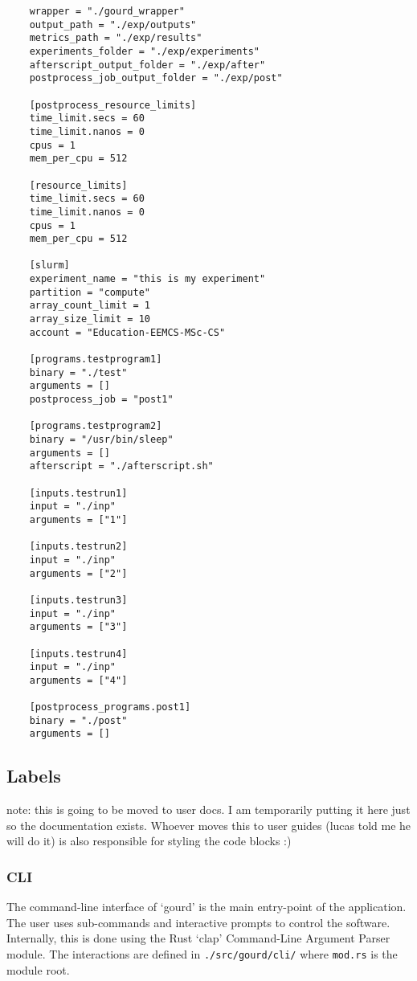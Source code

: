 \begin{verbatim}
    wrapper = "./gourd_wrapper"
    output_path = "./exp/outputs"
    metrics_path = "./exp/results"
    experiments_folder = "./exp/experiments"
    afterscript_output_folder = "./exp/after"
    postprocess_job_output_folder = "./exp/post"
    
    [postprocess_resource_limits]
    time_limit.secs = 60
    time_limit.nanos = 0
    cpus = 1
    mem_per_cpu = 512
    
    [resource_limits]
    time_limit.secs = 60
    time_limit.nanos = 0
    cpus = 1
    mem_per_cpu = 512
    
    [slurm]
    experiment_name = "this is my experiment"
    partition = "compute"
    array_count_limit = 1
    array_size_limit = 10
    account = "Education-EEMCS-MSc-CS"
    
    [programs.testprogram1]
    binary = "./test"
    arguments = []
    postprocess_job = "post1"
    
    [programs.testprogram2]
    binary = "/usr/bin/sleep"
    arguments = []
    afterscript = "./afterscript.sh"
    
    [inputs.testrun1]
    input = "./inp"
    arguments = ["1"]
    
    [inputs.testrun2]
    input = "./inp"
    arguments = ["2"]
    
    [inputs.testrun3]
    input = "./inp"
    arguments = ["3"]
    
    [inputs.testrun4]
    input = "./inp"
    arguments = ["4"]
    
    [postprocess_programs.post1]
    binary = "./post"
    arguments = []
\end{verbatim}

\subsection{Labels}
note: this is going to be moved to user docs.
I am temporarily putting it here just so the documentation exists.
Whoever moves this to user guides (lucas told me he will do it) is also responsible for styling the code blocks :)

\subsubsection{CLI}

The command-line interface of `gourd' is the main entry-point of the
application. The user uses sub-commands and interactive prompts to control
the software. Internally, this is done using the Rust `clap' Command-Line
Argument Parser module. The interactions are defined in
\verb|./src/gourd/cli/| where \verb|mod.rs| is the module root.
